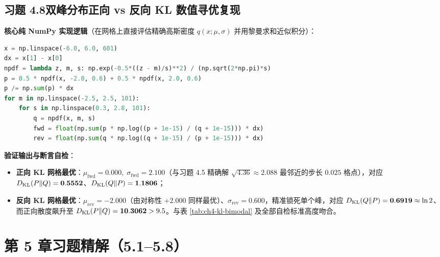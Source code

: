 \subsection*{习题 4.8\quad 双峰分布正向 vs 反向 KL 数值寻优复现}
\textbf{核心纯 NumPy 实现逻辑}（在网格上直接评估精确高斯密度 $q(x;\mu,\sigma)$ 并用黎曼求和近似积分）：
\begin{lstlisting}[language=Python]
x = np.linspace(-6.0, 6.0, 601)
dx = x[1] - x[0]
npdf = lambda z, m, s: np.exp(-0.5*((z - m)/s)**2) / (np.sqrt(2*np.pi)*s)
p = 0.5 * npdf(x, -2.0, 0.6) + 0.5 * npdf(x, 2.0, 0.6)
p /= np.sum(p) * dx
for m in np.linspace(-2.5, 2.5, 101):
    for s in np.linspace(0.3, 2.8, 101):
        q = npdf(x, m, s)
        fwd = float(np.sum(p * np.log((p + 1e-15) / (q + 1e-15))) * dx)
        rev = float(np.sum(q * np.log((q + 1e-15) / (p + 1e-15))) * dx)
\end{lstlisting}
\textbf{验证输出与断言自检}：
\begin{itemize}
  \item \textbf{正向 KL 网格最优}：$\mu_{\mathrm{fwd}} = 0.000,\; \sigma_{\mathrm{fwd}} = 2.100$（与习题 4.5 精确解 $\sqrt{4.36}\approx 2.088$ 最邻近的步长 $0.025$ 格点），对应 $D_{\mathrm{KL}}(P\|Q) = \mathbf{0.5552}$、$D_{\mathrm{KL}}(Q\|P) = \mathbf{1.1806}$；
  \item \textbf{反向 KL 网格最优}：$\mu_{\mathrm{rev}} = -2.000$（由对称性 $+2.000$ 同样最优）、$\sigma_{\mathrm{rev}} = 0.600$，精准锁死单个峰，对应 $D_{\mathrm{KL}}(Q\|P) = \mathbf{0.6919} \approx \ln 2$、而正向散度飙升至 $D_{\mathrm{KL}}(P\|Q) = \mathbf{10.3062} > 9.5$。与表 \ref{tab:ch4-kl-bimodal} 及全部自检标准高度吻合。
\end{itemize}

\section{第 5 章习题精解（5.1--5.8）}

